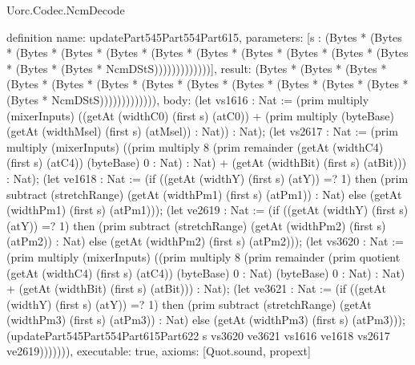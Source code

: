 \begin{lexlean}{Uorc.Codec.NcmDecode}
\begin{semanticmodule}
definition{
  name: updatePart545Part554Part615,
  parameters: [s : (Bytes * (Bytes * (Bytes * (Bytes * (Bytes * (Bytes * (Bytes * (Bytes * (Bytes * (Bytes * (Bytes * (Bytes * (Bytes * NcmDStS)))))))))))))],
  result: (Bytes * (Bytes * (Bytes * (Bytes * (Bytes * (Bytes * (Bytes * (Bytes * (Bytes * (Bytes * (Bytes * (Bytes * (Bytes * NcmDStS))))))))))))),
  body: (let vs1616 : Nat := (prim multiply (mixerInputs) ((getAt (widthC0) (first s) (atC0)) + (prim multiply (byteBase) (getAt (widthMsel) (first s) (atMsel)) : Nat)) : Nat); (let vs2617 : Nat := (prim multiply (mixerInputs) ((prim multiply 8 (prim remainder (getAt (widthC4) (first s) (atC4)) (byteBase) 0 : Nat) : Nat) + (getAt (widthBit) (first s) (atBit))) : Nat); (let ve1618 : Nat := (if ((getAt (widthY) (first s) (atY)) =? 1) then (prim subtract (stretchRange) (getAt (widthPm1) (first s) (atPm1)) : Nat) else (getAt (widthPm1) (first s) (atPm1))); (let ve2619 : Nat := (if ((getAt (widthY) (first s) (atY)) =? 1) then (prim subtract (stretchRange) (getAt (widthPm2) (first s) (atPm2)) : Nat) else (getAt (widthPm2) (first s) (atPm2))); (let vs3620 : Nat := (prim multiply (mixerInputs) ((prim multiply 8 (prim remainder (prim quotient (getAt (widthC4) (first s) (atC4)) (byteBase) 0 : Nat) (byteBase) 0 : Nat) : Nat) + (getAt (widthBit) (first s) (atBit))) : Nat); (let ve3621 : Nat := (if ((getAt (widthY) (first s) (atY)) =? 1) then (prim subtract (stretchRange) (getAt (widthPm3) (first s) (atPm3)) : Nat) else (getAt (widthPm3) (first s) (atPm3))); (updatePart545Part554Part615Part622 s vs3620 ve3621 vs1616 ve1618 vs2617 ve2619))))))),
  executable: true,
  axioms: [Quot.sound, propext]
}


\end{semanticmodule}
\end{lexlean}
